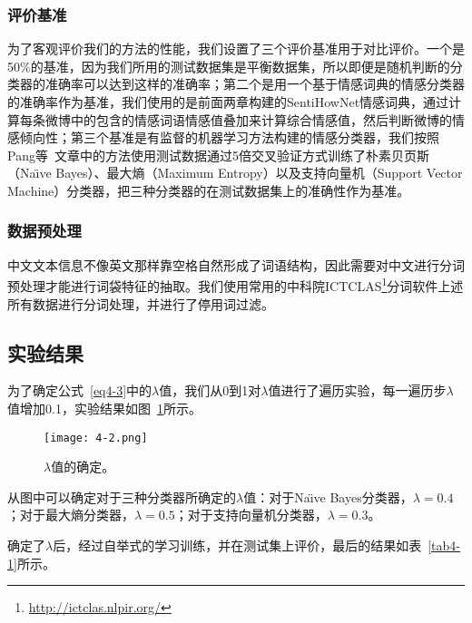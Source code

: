 \subsubsection{评价基准}
为了客观评价我们的方法的性能，我们设置了三个评价基准用于对比评价。一个是50\%的基准，因为我们所用的测试数据集是平衡数据集，所以即便是随机判断的分类器的准确率可以达到这样的准确率；第二个是用一个基于情感词典的情感分类器的准确率作为基准，我们使用的是前面两章构建的SentiHowNet情感词典，通过计算每条微博中的包含的情感词语情感值叠加来计算综合情感值，然后判断微博的情感倾向性；第三个基准是有监督的机器学习方法构建的情感分类器，我们按照Pang等~文章中的方法使用测试数据通过5倍交叉验证方式训练了朴素贝页斯（Na\"\i ve Bayes）、最大熵（Maximum Entropy）以及支持向量机（Support Vector Machine）分类器，把三种分类器的在测试数据集上的准确性作为基准。

\subsubsection{数据预处理}
中文文本信息不像英文那样靠空格自然形成了词语结构，因此需要对中文进行分词预处理才能进行词袋特征的抽取。我们使用常用的中科院ICTCLAS\footnote{\url{http://ictclas.nlpir.org/}}分词软件上述所有数据进行分词处理，并进行了停用词过滤。

\subsection{实验结果}
\label{result}

为了确定公式~\ref{eq4-3}中的$ \lambda $值，我们从0到1对$ \lambda $值进行了遍历实验，每一遍历步$ \lambda $值增加0.1，实验结果如图~\ref{fig4-2}所示。

\begin{figure}[htp]
\centering
\texttt{[image: 4-2.png]}
\caption{$ \lambda $值的确定。}
\label{fig4-2}
\end{figure}
从图中可以确定对于三种分类器所确定的$ \lambda $值：对于Na\"\i ve Bayes分类器，$ \lambda=0.4 $；对于最大熵分类器，$ \lambda=0.5 $；对于支持向量机分类器，$ \lambda=0.3 $。

确定了$ \lambda$后，经过自举式的学习训练，并在测试集上评价，最后的结果如表~\ref{tab4-1}所示。


